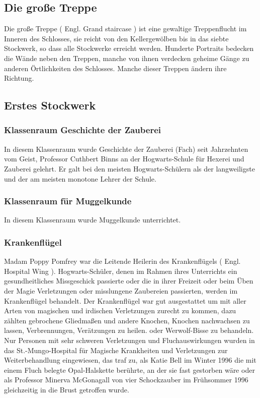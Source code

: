 \documentclass[a4paper, 10pt]{article}
\begin{document}
\subsection*{\Large Die große Treppe}
Die große Treppe (  Engl.  Grand staircase ) ist eine gewaltige Treppenflucht im Inneren des Schlosses, sie reicht von den Kellergewölben bis in das siebte Stockwerk, so dass alle Stockwerke erreicht werden. Hunderte Portraits bedecken die Wände neben den Treppen, manche von ihnen verdecken geheime Gänge zu anderen Örtlichkeiten des Schlosses. Manche dieser Treppen ändern ihre Richtung.


\subsection*{\Large Erstes Stockwerk}
\subsubsection*{\large Klassenraum Geschichte der Zauberei}
In diesem Klassenraum wurde Geschichte der Zauberei (Fach) seit Jahrzehnten vom Geist, Professor Cuthbert Binns an der Hogwarts-Schule für Hexerei und Zauberei gelehrt. Er galt bei den meisten Hogwarts-Schülern als der langweiligste und der am meisten monotone Lehrer der Schule.
\subsubsection*{\large Klassenraum für Muggelkunde}
In diesem Klassenraum wurde Muggelkunde unterrichtet.
\subsubsection*{\large Krankenflügel}
Madam Poppy Pomfrey war die Leitende Heilerin des Krankenflügels (  Engl.  Hospital Wing ). Hogwarts-Schüler, denen im Rahmen ihres Unterrichts ein gesundheitliches Missgeschick passierte oder die in ihrer Freizeit oder beim Üben der Magie Verletzungen oder misslungene Zaubereien passierten, werden im Krankenflügel behandelt. Der Krankenflügel war gut ausgestattet um mit aller Arten von magischen und irdischen Verletzungen zurecht zu kommen, dazu zählten gebrochene Gliedmaßen und andere Knochen, Knochen nachwachsen zu lassen, Verbrennungen, Verätzungen zu heilen. oder Werwolf-Bisse zu behandeln.
\vspace{10pt}
\newline
Nur Personen mit sehr schweren Verletzungen und Fluchauswirkungen wurden in das St.-Mungo-Hospital für Magische Krankheiten und Verletzungen zur Weiterbehandlung eingewiesen, das traf zu, als Katie Bell im Winter 1996 die mit einem Fluch belegte Opal-Halskette berührte, an der sie fast gestorben wäre oder als Professor Minerva McGonagall von vier Schockzauber im Frühsommer 1996 gleichzeitig in die Brust getroffen wurde.
\end{document}
